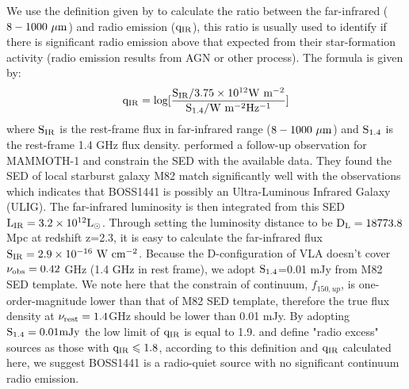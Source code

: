 \documentclass[../Results.tex]{subfiles}
\begin{document}
	We use the definition given by \cite{ivison2010far} to calculate the ratio between the far-infrared ($\rm 8-1000 \ \mu m$) and radio emission ($\rm q_{IR}$), this ratio is usually used to identify if there is significant radio emission above that expected from their star-formation activity (radio emission results from AGN or other process). The formula is given by:
	\begin{equation}
		\rm q_{IR}=log[\frac{S_{IR}/3.75 \times 10^{12} W \ m^{-2}}{S_{1.4}/W \ m^{-2} Hz^{-1}}]
		\label{q_IR}
	\end{equation}
	where $\rm S_{IR}$ is the rest-frame flux in far-infrared range ($8-1000 \ \rm \mu m $) and $\rm S_{1.4}$ is the rest-frame 1.4 GHz flux density. \citep{arrigoni2018overdensity} performed a follow-up observation for MAMMOTH-1 and constrain the SED with the available data. They found the SED of local starburst galaxy M82 match significantly well with the observations which indicates that BOSS1441 is possibly an Ultra-Luminous Infrared Galaxy (ULIG). The far-infrared luminosity is then integrated from this SED $\rm L_{IR}=3.2 \times 10^{12}L_{\odot}$. Through setting the luminosity distance to be $\rm D_{L}=18773.8$ Mpc at redshift z=2.3, it is easy to calculate the far-infrared flux $\rm S_{IR}=2.9 \times 10^{-16}\ W \ cm^{-2}$.  Because the D-configuration of VLA doesn't cover $\rm \nu_{obs}=0.42$ GHz (1.4 GHz in rest frame), we adopt $\rm S_{1.4}$=0.01 mJy from M82 SED template. We note here that the constrain of continuum, $f_{150,up}$, is one-order-magnitude lower than that of M82 SED template, therefore the true flux density at $\rm \nu_{rest}=1.4$GHz should be lower than 0.01 mJy. By adopting $\rm S_{1.4}=0.01 mJy$ the low limit of $\rm q_{IR}$ is equal to 1.9. \cite{ivison2010far} and \cite{del2013goods} define "radio excess" sources as those with $\rm q_{IR} \leqslant 1.8$, according to this definition and $\rm q_{IR}$ calculated here, we suggest BOSS1441 is a radio-quiet source with no significant continuum radio emission.
\end{document}

